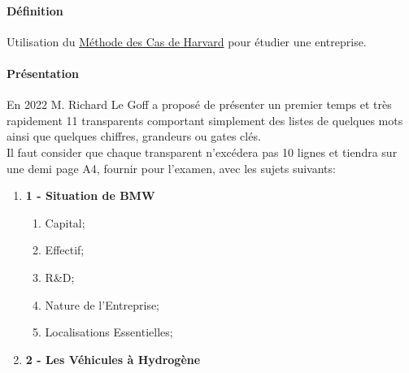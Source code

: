 \documentclass{article}
\begin{document}
\paragraph{Définition}Utilisation du \href{https://fr.wikipedia.org/wiki/M%C3%A9thode_des_cas}{Méthode des Cas de Harvard} pour étudier une entreprise.

\paragraph{Présentation}En 2022 M. Richard Le Goff a proposé de présenter un premier temps et très rapidement 11 transparents comportant simplement des listes de quelques mots ainsi que quelques chiffres, grandeurs ou gates clés.\\

\noindent Il faut consider que chaque transparent n'excédera pas 10 lignes et tiendra sur une demi page A4, fournir pour l'examen, avec les sujets suivants:
\begin{enumerate}
    \item \textbf{1 - Situation de BMW}
    \begin{enumerate}[noitemsep]
        \item Capital;
        \item Effectif;
        \item R&D;
        \item Nature de l'Entreprise;
        \item Localisations Essentielles;
    \end{enumerate}

    \item \textbf{2 - Les Véhicules à Hydrogène}
\end{enumerate} 






\end{document}
